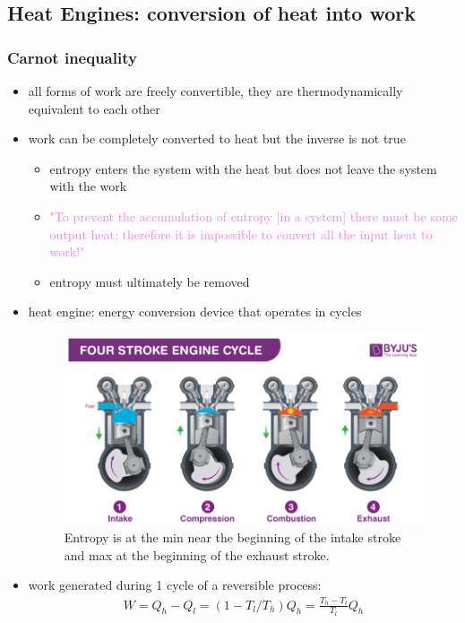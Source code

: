 \subsection{Heat Engines: conversion of heat into work}
\subsubsection{Carnot inequality}
\begin{itemize}
	\item all forms of work are freely convertible, they are thermodynamically
	      equivalent to each other
	\item work can be completely converted to heat but the inverse is not true
	      \begin{itemize}
		      \item entropy enters the system with the heat but does not leave the system with
		            the work
		      \item \textcolor{violet}{"To prevent the accumulation of entropy [in a system] there
			            must be some output heat; therefore it is impossible to convert all the input heat
			            to work!"}
		      \item entropy must ultimately be removed
	      \end{itemize}
	\item heat engine: energy conversion device that operates in cycles
	      \begin{figure}
		      \centering
		      \includegraphics[width=.75\textwidth]{Figures/4StrokeEngineCycle.png}
		      \caption{Entropy is at the min near the beginning of the intake stroke and max at
			      the beginning of the exhaust stroke.}
		      \label{fig:engine_diagram}
	      \end{figure}
	\item work generated during 1 cycle of a reversible process:
	      \begin{align}
		      W = Q_h - Q_l = (1 - T_l/T_h)Q_h = \frac{T_h - T_l}{T_l} Q_h \\

\end{align}
\end{itemize}
